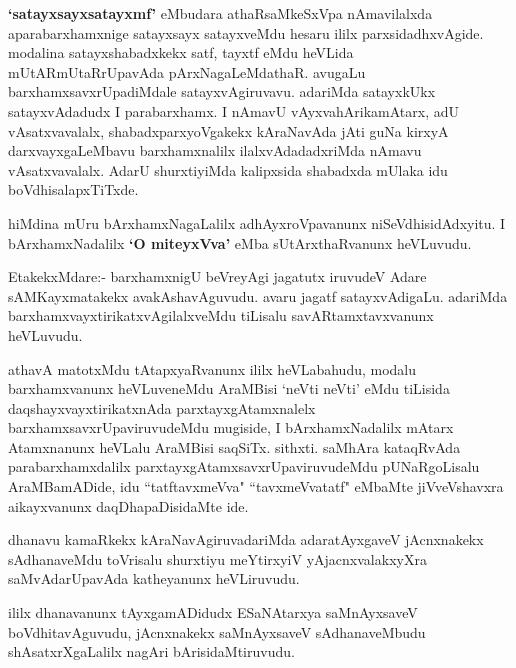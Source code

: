 \begin{artha}
\textbf{`satayxsayxsatayxmf'} eMbudara athaRsaMkeSxVpa nAmavilalxda aparabarxhamxnige
  satayxsayx satayxveMdu hesaru ililx parxsidadhxvAgide. modalina
  satayxshabadxkekx satf, tayxtf eMdu heVLida mUtARmUtaRrUpavAda
  pArxNagaLeMdathaR. avugaLu barxhamxsavxrUpadiMdale satayxvAgiruvavu.
  adariMda satayxkUkx satayxvAdadudx I parabarxhamx. I nAmavU
  vAyxvahArikamAtarx, adU vAsatxvavalalx, shabadxparxyoVgakekx
  kAraNavAda jAti guNa kirxyA darxvayxgaLeMbavu barxhamxnalilx
  ilalxvAdadadxriMda nAmavu vAsatxvavalalx. AdarU shurxtiyiMda
  kalipxsida shabadxda mUlaka idu boVdhisalapxTiTxde.
\end{artha}



\centerline{}

\begin{artha}
hiMdina mUru bArxhamxNagaLalilx adhAyxroVpavanunx
niSeVdhisidAdxyitu.  I bArxhamxNadalilx \textbf{`O miteyxVva'} eMba sUtArxthaRvanunx heVLuvudu. 

EtakekxMdare:- barxhamxnigU beVreyAgi jagatutx iruvudeV Adare
sAMKayxmatakekx avakAshavAguvudu. avaru jagatf satayxvAdigaLu. adariMda
barxhamxvayxtirikatxvAgilalxveMdu tiLisalu savARtamxtavxvanunx heVLuvudu.
\end{artha}

\begin{artha}
athavA matotxMdu tAtapxyaRvanunx ililx heVLabahudu, modalu
barxhamxvanunx heVLuveneMdu AraMBisi `neVti neVti' eMdu tiLisida
daqshayxvayxtirikatxnAda parxtayxgAtamxnalelx
barxhamxsavxrUpaviruvudeMdu mugiside, I bArxhamxNadalilx mAtarx
Atamxnanunx heVLalu AraMBisi saqSiTx. sithxti. saMhAra
kataqRvAda parabarxhamxdalilx parxtayxgAtamxsavxrUpaviruvudeMdu
pUNaRgoLisalu AraMBamADide, idu ``tatftavxmeVva" ``tavxmeVvatatf" eMbaMte
jiVveVshavxra aikayxvanunx daqDhapaDisidaMte ide.
\end{artha}


\begin{artha}
dhanavu kamaRkekx kAraNavAgiruvadariMda adaratAyxgaveV jAcnxnakekx
sAdhanaveMdu toVrisalu shurxtiyu meYtirxyiV yAjacnxvalakxyXra
saMvAdarUpavAda katheyanunx heVLiruvudu.

ililx dhanavanunx tAyxgamADidudx ESaNAtarxya saMnAyxsaveV
boVdhitavAguvudu, jAcnxnakekx saMnAyxsaveV sAdhanaveMbudu
shAsatxrXgaLalilx nagAri bArisidaMtiruvudu.
\end{artha}

